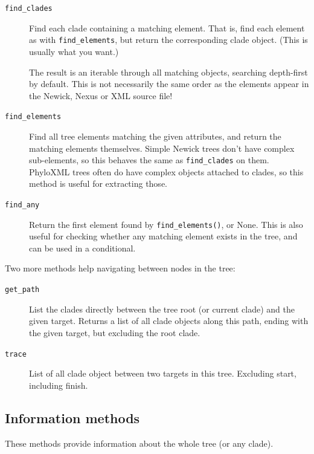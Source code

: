 \documentclass{report}
\begin{document}
\begin{description}
  \item[\texttt{find\_clades}]
    Find each clade containing a matching element. That is, find each element as with
    \verb|find_elements|, but return the corresponding clade object. (This is usually what you
    want.)

    The result is an iterable through all matching objects, searching depth-first by default.
    This is not necessarily the same order as the elements appear in the Newick, Nexus or XML
    source file!

  \item[\texttt{find\_elements}]
    Find all tree elements matching the given attributes, and return the matching elements
    themselves. Simple Newick trees don't have complex sub-elements, so this behaves the same
    as \verb|find_clades| on them. PhyloXML trees often do have complex objects attached to
    clades, so this method is useful for extracting those.

  \item[\texttt{find\_any}]
    Return the first element found by \verb|find_elements()|, or None. This is also useful for
    checking whether any matching element exists in the tree, and can be used in a conditional.

\end{description}

Two more methods help navigating between nodes in the tree:

\begin{description}
  \item[\texttt{get\_path}]
    List the clades directly between the tree root (or current clade) and the given target.
    Returns a list of all clade objects along this path, ending with the given target, but
    excluding the root clade.

  \item[\texttt{trace}]
    List of all clade object between two targets in this tree. Excluding start, including
    finish.

\end{description}

\subsection{Information methods}

These methods provide information about the whole tree (or any clade).
\end{document}
